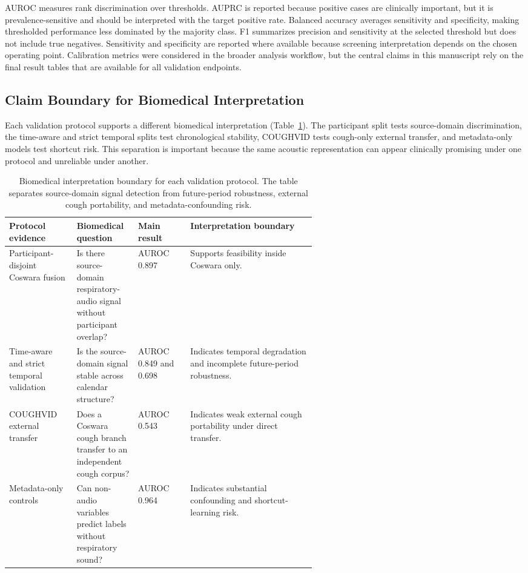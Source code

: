\documentclass[preprint,12pt]{elsarticle}
\begin{document}
AUROC measures rank discrimination over thresholds. AUPRC is reported because positive cases are clinically important, but it is prevalence-sensitive and should be interpreted with the target positive rate. Balanced accuracy averages sensitivity and specificity, making thresholded performance less dominated by the majority class. F1 summarizes precision and sensitivity at the selected threshold but does not include true negatives. Sensitivity and specificity are reported where available because screening interpretation depends on the chosen operating point. Calibration metrics were considered in the broader analysis workflow, but the central claims in this manuscript rely on the final result tables that are available for all validation endpoints.

\subsection{Claim Boundary for Biomedical Interpretation}

Each validation protocol supports a different biomedical interpretation (Table~\ref{tab:claim_boundary}). The participant split tests source-domain discrimination, the time-aware and strict temporal splits test chronological stability, COUGHVID tests cough-only external transfer, and metadata-only models test shortcut risk. This separation is important because the same acoustic representation can appear clinically promising under one protocol and unreliable under another.

\begin{table}[t]
\centering
\caption{Biomedical interpretation boundary for each validation protocol. The table separates source-domain signal detection from future-period robustness, external cough portability, and metadata-confounding risk.}
\label{tab:claim_boundary}
\scriptsize
\setlength{\tabcolsep}{2.5pt}
\begin{tabularx}{\linewidth}{p{0.22\linewidth} p{0.20\linewidth} p{0.17\linewidth} X}
\toprule
Protocol evidence & Biomedical question & Main result & Interpretation boundary \\
\midrule
Participant-disjoint Coswara fusion & Is there source-domain respiratory-audio signal without participant overlap? & AUROC 0.897 & Supports feasibility inside Coswara only. \\
Time-aware and strict temporal validation & Is the source-domain signal stable across calendar structure? & AUROC 0.849 and 0.698 & Indicates temporal degradation and incomplete future-period robustness. \\
COUGHVID external transfer & Does a Coswara cough branch transfer to an independent cough corpus? & AUROC 0.543 & Indicates weak external cough portability under direct transfer. \\
Metadata-only controls & Can non-audio variables predict labels without respiratory sound? & AUROC 0.964 & Indicates substantial confounding and shortcut-learning risk. \\
\bottomrule
\end{tabularx}
\end{table}
\end{document}
